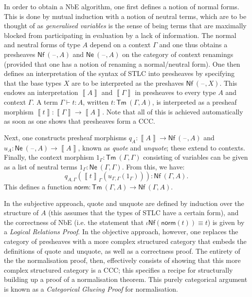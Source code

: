 \documentclass{article}[9pt]
\newcommand{\blank}{\mathord{\hspace{1pt}\text{--}\hspace{1pt}}}
\newcommand{\bkt}[1]{\left(#1\right)}
\newcommand{\lbkt}[1]{\left\llbracket#1\right\rrbracket}
\begin{document}
In order to obtain a NbE algorithm, one first defines a notion of normal forms.
This is done by mutual induction with a notion of neutral terms, which are to be
thought of as \emph{generalised variables} is the sense of being terms that are
maximally blocked from participating in evaluation by a lack of information. The
normal and neutral forms of type $A$ depend on a context $\Gamma$ and one thus
obtains a presheaves $\mathsf{Nf}~(\blank,A)$ and $\mathsf{Ne}~(\blank,A)$ on the
category of context renamings (provided that one has a notion of renaming a
normal/neutral form). One then defines an interpretation of the syntax of STLC
into presheaves by specifying that the base types $X$ are to be interpreted as
the preshaves $\mathsf{Nf}~(\blank,X)$. This endows an interpretation $\lbkt{A}$
and $\lbkt{\Gamma}$ in presheaves to every type $A$ and context $\Gamma$. A term
$\Gamma \vdash t : A$, written $t : \textsf{Tm}~(\Gamma, A)$, is interpreted as a
presheaf morphism $\lbkt{t} : \lbkt{\Gamma} \to \lbkt{A}$. Note that all of this
is achieved automatically as soon as one shows that presheaves form a CCC.

Next, one constructs presheaf morphisms $q_A : \lbkt{A} \to \mathsf{Nf}~(\blank,
A)$ and $u_A : \mathsf{Ne}~(\blank, A) \to \lbkt{A}$, known as \emph{quote} and
\emph{unquote}; these extend to contexts. Finally, the context morphism
$1_\Gamma : \mathsf{Tm}~(\Gamma, \Gamma)$ consisting of variables can be given as a
list of neutral terms $1_\Gamma : \mathsf{Ne}~(\Gamma,\Gamma)$. From this, we
have: \[q_{A,\Gamma} \bkt{\lbkt{t}_\Gamma \bkt{u_{\Gamma,\Gamma}
\bkt{1_\Gamma}}} : \mathsf{Nf}~(\Gamma, A).\] This defines a function
$\mathsf{norm} : \mathsf{Tm}~(\Gamma, A) \to \mathsf{Nf}~(\Gamma, A)$.

In the subjective approach, quote and unquote are defined by induction over the
structure of $A$ (this assumes that the types of STLC have a certain form), and
the correctness of NbE (i.e. the statement that $\iota\mathsf{Nf}
\bkt{\mathsf{norm} \bkt{t}} \equiv t$) is given by a \emph{Logical Relations
Proof}. In the objective approach, however, one replaces the category of
presheaves with a more complex structured category that embeds the definitions
of quote and unquote, as well as a correctness proof. The entirety of the the
normalisation proof, then, effectively consists of showing that this more
complex structured category is a CCC; this specifies a recipe for structurally
building up a proof of a normalisation theorem. This purely categorical argument
is known as a \emph{Categorical Glueing Proof} for normalisation.
\end{document}
